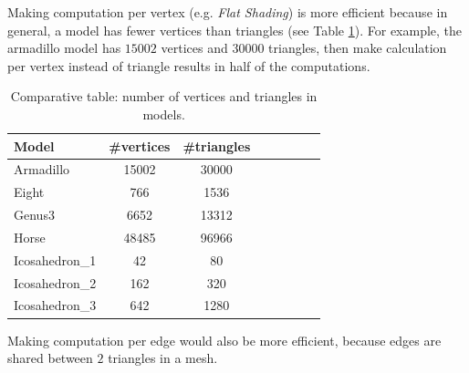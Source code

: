 Making computation per vertex (e.g. \textit{Flat Shading}) is more efficient because in general, a model has fewer vertices than triangles (see Table \ref{table:model-table-vertices}).
For example, the armadillo model has $15002$ vertices and $30000$ triangles, then make calculation per vertex instead of triangle results in half of the computations.

\begin{table}[!h]
    \centering
\begin{tabular}{l*{6}{c}r}
    \centering
    Model              & \#vertices & \#triangles \\
    \hline
    Armadillo          & 15002 & 30000 \\
    Eight              & 766 & 1536 \\
    Genus3             & 6652 & 13312  \\
    Horse              & 48485 &  96966\\
    Icosahedron\_1      &  42 & 80 \\
    Icosahedron\_2      &  162 & 320 \\
    Icosahedron\_3      & 642 &  1280
\end{tabular}
\caption{Comparative table: number of vertices and triangles in models.}
\label{table:model-table-vertices}
\end{table}

Making computation per edge would also be more efficient, because edges are shared between $2$ triangles in a mesh.

